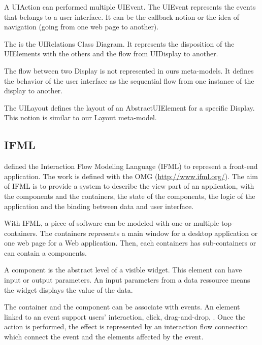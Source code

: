 \documentclass[conference]{IEEEtran}
\begin{document}
A UIAction can performed multiple UIEvent.
The UIEvent represents the events that belongs to a user interface.
It can be the callback notion or the idea of navigation (\ie going from one web page to another).


The  is the UIRelations Class Diagram.
It represents the disposition of the UIElements with the others and the flow from
    UIDisplay to another.

The flow between two Display is not represented in ours meta-models.
It defines the behavior of the user interface as the sequential 
    flow from one instance of the display to another.

The UILayout defines the layout of an AbstractUIElement for a specific Display.
This notion is similar to our Layout meta-model.

\subsection{IFML}
\label{sec:ifml}

\citet{brambilla2014interaction} defined the Interaction Flow Modeling Language (IFML) to represent a front-end application.
The work is defined with the OMG (\url{http://www.ifml.org/}).
The aim of IFML is to provide a system to describe the view part of an application,
    with the components and the containers, the state of the components,
    the logic of the application and the binding between data and user interface.

With IFML, a piece of software can be modeled with one or multiple top-containers.
The containers represents a main window for a desktop application or one web page for a Web application.
Then, each containers has sub-containers or can contain a components.

A component is the abstract level of a visible widget.
This element can have input or output parameters.
An input parameters from a data ressource means the widget displays the value of the data.

The container and the component can be associate with events.
An element linked to an event support users' interaction, \eg click, drag-and-drop, \etc.
Once the action is performed, the effect is represented by an interaction flow connection which connect the event
    and the elements affected by the event.


\end{document}

